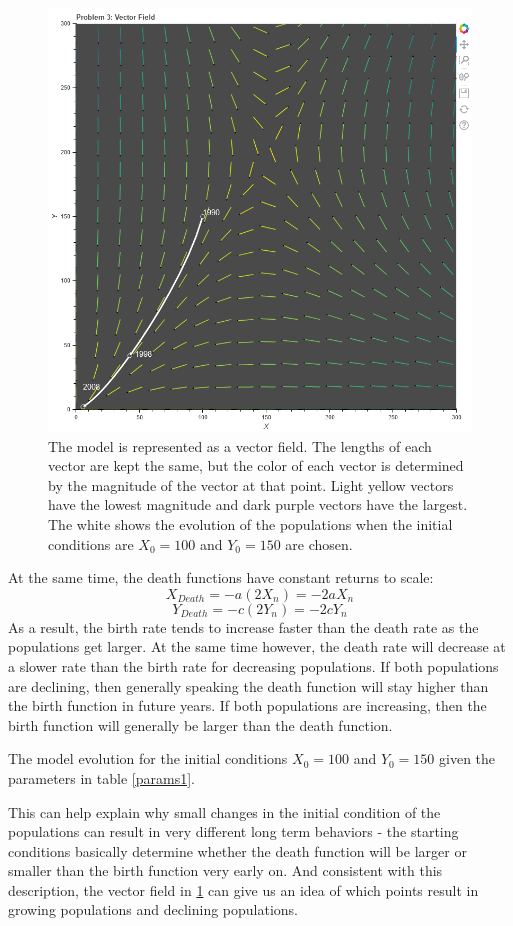 \documentclass[12pt,a4paper,titlepage]{report}
\begin{document}
		\begin{figure}[htbp]
			\centerline{\includegraphics[scale=.5]{charts/problem3_chart.png}}
			\caption{The model is represented as a vector field. The lengths of each vector are kept the same, but the color of each vector is determined by the magnitude of the vector at that point. Light yellow vectors have the lowest magnitude and dark purple vectors have the largest. The white shows the evolution of the populations when the initial conditions are \(X_{0} = 100\) and \(Y_{0} = 150\) are chosen.}
			\label{fig:p3}
		\end{figure}
		At the same time, the death functions have constant returns to scale:
		\[X_{Death} = -a (2X_{n}) = -2aX_{n}\]
		\[Y_{Death} = -c (2Y_{n}) = -2cY_{n}\]
		As a result, the birth rate tends to increase faster than the death rate as the populations get larger. At the same time however, the death rate will decrease at a slower rate than the birth rate for decreasing populations. If both populations are declining, then generally speaking the death function will stay higher than the birth function in future years. If both populations are increasing, then the birth function will generally be larger than the death function. 
		\begin{table} 
			\centering
			
			\caption{The model evolution for the initial conditions \(X_{0} = 100\) and \(Y_{0} = 150\) given the parameters in table \ref{params1}.}
			\label{tab:p3}
		\end{table}
		This can help explain why small changes in the initial condition of the populations can result in very different long term behaviors - the starting conditions basically determine whether the death function will be larger or smaller than the birth function very early on. And consistent with this description, the vector field in \ref{fig:p3} can give us an idea of which points result in growing populations and declining populations. 
		
\end{document}

